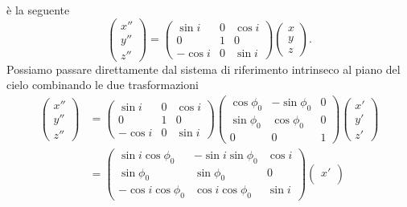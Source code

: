 {è la seguente
\begin{equation}
  \begin{pmatrix}
    x'' \\
    y'' \\
    z''
  \end{pmatrix} =
  \begin{pmatrix}
    \sin i  & 0 & \cos i \\
    0       & 1 & 0      \\
    -\cos i & 0 & \sin i
  \end{pmatrix}
  \begin{pmatrix}
    x \\
    y \\
    z
  \end{pmatrix}.
\end{equation}
Possiamo passare direttamente dal sistema di riferimento intrinseco al piano del
cielo combinando le due trasformazioni
\begin{equation}
  \begin{split}
    \begin{pmatrix}
      x'' \\
      y'' \\
      z''
    \end{pmatrix} &=
    \begin{pmatrix}
      \sin i  & 0 & \cos i \\
      0       & 1 & 0      \\
      -\cos i & 0 & \sin i
    \end{pmatrix}
    \begin{pmatrix}
      \cos\phi_0 & -\sin\phi_0 & 0 \\
      \sin\phi_0 & \cos\phi_0  & 0 \\
      0 & 0 & 1
    \end{pmatrix}
    \begin{pmatrix}
      x' \\
      y' \\
      z'
    \end{pmatrix} \\
    &=
    \begin{pmatrix}
      \sin i \cos\phi_0 & -\sin i\sin\phi_0 & \cos i \\
      \sin\phi_0        & \sin\phi_0        & 0      \\
      -\cos i\cos\phi_0 & \cos i\cos\phi_0  & \sin i
    \end{pmatrix}
    \begin{pmatrix}
      x' \\

\end{pmatrix}
\end{split}
\end{equation}}
